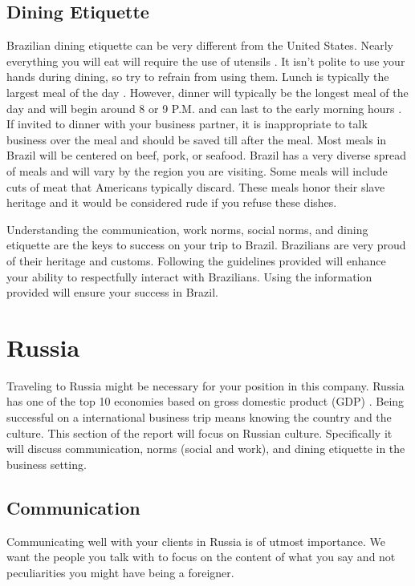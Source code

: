 \documentclass[11pt,a4paper,twoside]{report}
\begin{document}
\section{Dining Etiquette}

Brazilian dining etiquette can be very different from the United States.
Nearly everything you will eat will require the use of utensils
\citep*[pg. 83]{herrington}. It isn’t polite to use your hands during dining, so
try to refrain from using them. Lunch is typically the largest meal of the
day \citep*[pg. 83]{herrington}. However, dinner will typically be the longest meal
of the day and will begin around 8 or 9 P.M. and can last to the early
morning hours \citep*[pg. 83]{herrington}. If invited to dinner with your business
partner, it is inappropriate to talk business over the meal and should be
saved till after the meal. Most meals in Brazil will be centered on beef,
pork, or seafood. Brazil has a very diverse spread of meals and will vary
by the region you are visiting. Some meals will include cuts of meat that
Americans typically discard. These meals honor their slave heritage and it
would be considered rude if you refuse these dishes.

Understanding the communication, work norms, social norms, and dining etiquette
are the keys to success on your trip to Brazil. Brazilians are very proud of
their heritage and customs. Following the guidelines provided will enhance your
ability to respectfully interact with Brazilians. Using the information
provided will ensure your success in Brazil.

\chapter{Russia}

Traveling to Russia might be necessary for your position in this company.
Russia has one of the top 10 economies based on gross domestic product (GDP)
\citep*{russianGDP}. Being successful on a international business trip means knowing the
country and the culture. This section of the report will focus on Russian
culture. Specifically it will discuss communication, norms (social and work),
and dining etiquette in the business setting.

\section{Communication}

Communicating well with your clients in Russia is of utmost importance. We want
the people you talk with to focus on the content of what you say and not
peculiarities you might have being a foreigner.
\end{document}
